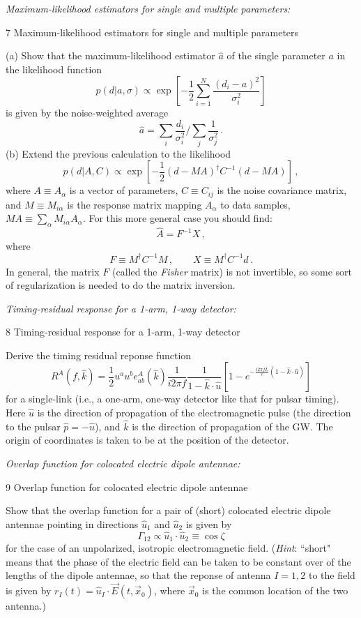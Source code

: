 \documentclass[11pt]{article}
\def\be{\begin{equation}}
\def\ee{\end{equation}}
\def\i{\item{}}
\begin{document}
\i {\em Maximum-likelihood estimators for single and multiple
parameters:}
{7 Maximum-likelihood estimators for single and multiple
parameters}

(a) Show that the maximum-likelihood estimator $\hat a$ of 
the single parameter $a$ in the likelihood function
\be
p(d|a, \sigma) \propto
\exp\left[-\frac{1}{2}\sum_{i=1}^N \frac{(d_i-a)^2}{\sigma_i^2}\right]
\ee
%
is given by the noise-weighted average
%
\be
\hat a={\sum_i \frac{d_i}{\sigma_i^2}}\bigg/{\sum_j \frac{1}{\sigma_j^2}}\,.
\ee
%
(b) Extend the previous calculation to the likelihood
\be
p(d|A, C) \propto
\exp\left[-\frac{1}{2}(d-MA)^\dagger C^{-1} (d-MA)\right]\,,
\ee
%
where $A\equiv A_\alpha$ is a vector of parameters,
$C\equiv C_{ij}$ is the noise covariance matrix, and 
$M\equiv M_{i\alpha}$ is the response matrix mapping 
$A_\alpha$ to data samples, $MA\equiv \sum_\alpha M_{i\alpha}A_\alpha$.
For this more general case you should find:
%
\be
\hat A = F^{-1} X\,,
\ee
%
where
%
\be
F \equiv M^\dagger C^{-1} M\,,\qquad
X \equiv M^\dagger C^{-1} d\,.
\ee
%
In general, the matrix $F$ (called the {\em Fisher} matrix)
is not invertible, so some sort of regularization is needed
to do the matrix inversion.

\i {\em Timing-residual response for a 1-arm, 1-way detector:}
{8 Timing-residual response for a 1-arm, 1-way detector}

Derive the timing residual reponse function
%
\be
R^A(f,\hat k) = 
\frac{1}{2}u^a u^b e^A_{ab}(\hat k)
\frac{1}{i2\pi f}
\frac{1}{1-\hat k\cdot \hat u}
\left[1-e^{-\frac{i2\pi fL}{c}(1-\hat k\cdot\hat u)}\right]
\ee
%
for a single-link (i.e., a one-arm, one-way detector like 
that for pulsar timing).
Here $\hat u$ is the direction of propagation of the
electromagnetic pulse (the direction to the pulsar
$\hat p=-\hat u$), and $\hat k$ is the direction 
of propagation of the GW.
The origin of coordinates is taken to be at the position 
of the detector.

\i {\em Overlap function for colocated electric dipole antennae:}
{9 Overlap function for colocated electric dipole antennae}

Show that the overlap function for a pair of (short)
colocated electric dipole antennae pointing in directions 
$\hat u_1$ and $\hat u_2$ is given by 
%
\be
\Gamma_{12} 
\propto
\hat u_1\cdot\hat u_2 
\equiv\cos\zeta
\ee
% 
for the case of an unpolarized, isotropic electromagnetic field.
({\em Hint}: ``short" means that the phase of the electric 
field can be taken to be constant over of the lengths of 
the dipole antennae, 
so that the reponse of antenna $I=1,2$ to the field is
given by $r_I(t)=\hat u_I\cdot\vec E(t, \vec x_0)$, where
$\vec x_0$ is the common location of the two antenna.)
 
\end{document}
